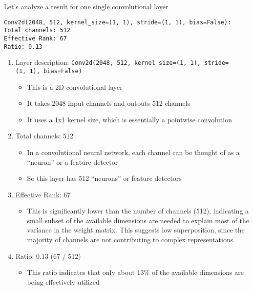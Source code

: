 \documentclass[
  letterpaper,
  DIV=11,
  numbers=noendperiod]{scrreprt}
\providecommand{\tightlist}{%
  \setlength{\itemsep}{0pt}\setlength{\parskip}{0pt}}\usepackage{longtable,booktabs,array}
\begin{document}
Let's analyze a result for one single convolutional layer

\begin{verbatim}
Conv2d(2048, 512, kernel_size=(1, 1), stride=(1, 1), bias=False):
Total channels: 512
Effective Rank: 67
Ratio: 0.13
\end{verbatim}

\begin{enumerate}
\def\labelenumi{\arabic{enumi}.}
\tightlist
\item
  Layer description:
  \texttt{Conv2d(2048,\ 512,\ kernel\_size=(1,\ 1),\ stride=(1,\ 1),\ bias=False)}

  \begin{itemize}
  \tightlist
  \item
    This is a 2D convolutional layer
  \item
    It takes 2048 input channels and outputs 512 channels
  \item
    It uses a 1x1 kernel size, which is essentially a pointwise
    convolution
  \end{itemize}
\item
  Total channels: 512

  \begin{itemize}
  \tightlist
  \item
    In a convolutional neural network, each channel can be thought of as
    a ``neuron'' or a feature detector
  \item
    So this layer has 512 ``neurons'' or feature detectors
  \end{itemize}
\item
  Effective Rank: 67

  \begin{itemize}
  \tightlist
  \item
    This is significantly lower than the number of channels (512),
    indicating a small subset of the available dimensions are needed to
    explain most of the variance in the weight matrix. This suggests low
    superposition, since the majority of channels are not contributing
    to complex representations.
  \end{itemize}
\item
  Ratio: 0.13 (67 / 512)

  \begin{itemize}
  \tightlist
  \item
    This ratio indicates that only about 13\% of the available
    dimensions are being effectively utilized
  \end{itemize}
\end{enumerate}
\end{document}
